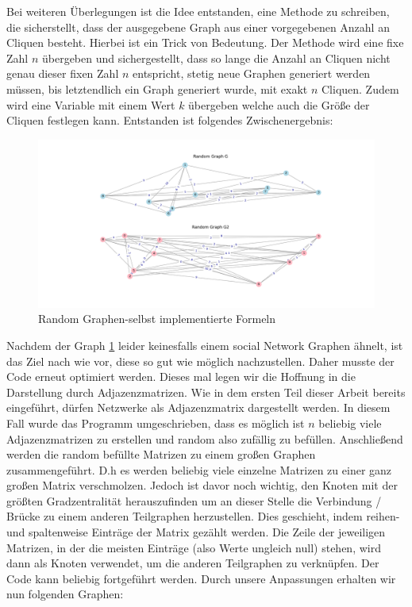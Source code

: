 Bei weiteren Überlegungen ist die Idee entstanden, eine Methode zu schreiben, die sicherstellt, dass der ausgegebene Graph aus einer vorgegebenen Anzahl an Cliquen besteht. Hierbei ist ein Trick von Bedeutung. Der Methode wird eine fixe Zahl $n$ übergeben und sichergestellt, dass so lange die Anzahl an Cliquen nicht genau dieser fixen Zahl $n$ entspricht, stetig neue Graphen generiert werden müssen, bis letztendlich ein Graph generiert wurde, mit exakt $n$ Cliquen. Zudem wird eine Variable mit einem Wert $k$ übergeben welche auch die Größe der Cliquen festlegen kann. Entstanden ist folgendes Zwischenergebnis:
\FloatBarrier
\begin{figure}[h!]
    \centering
    \hspace*{-1.5cm}
    \includegraphics[width=1.0\textwidth]{Graphics/perHand2.png}
    \caption{Random Graphen-selbst implementierte Formeln}
    \label{RandomGraphenFormeln}
\end{figure}

\FloatBarrier

Nachdem der Graph \ref{RandomGraphenFormeln} leider keinesfalls einem social Network Graphen ähnelt, ist das Ziel nach wie vor, diese so gut wie möglich nachzustellen. Daher musste der Code erneut optimiert werden. Dieses mal legen wir die Hoffnung in die Darstellung durch Adjazenzmatrizen. Wie in dem ersten Teil dieser Arbeit bereits eingeführt, dürfen Netzwerke als Adjazenzmatrix dargestellt werden. In diesem Fall wurde das Programm umgeschrieben, dass es möglich ist $n$ beliebig viele Adjazenzmatrizen zu erstellen und random also zufällig zu befüllen. Anschließend werden die random befüllte Matrizen zu einem großen Graphen zusammengeführt. D.h es werden beliebig viele einzelne Matrizen zu einer ganz großen Matrix verschmolzen. Jedoch ist davor noch wichtig, den Knoten mit der größten Gradzentralität herauszufinden um an dieser Stelle die Verbindung / Brücke zu einem anderen Teilgraphen herzustellen. Dies geschieht, indem reihen- und spaltenweise Einträge der Matrix gezählt werden. Die Zeile der jeweiligen Matrizen, in der die meisten Einträge (also Werte ungleich null) stehen, wird dann als Knoten verwendet, um die anderen Teilgraphen zu verknüpfen. Der Code kann beliebig fortgeführt werden. Durch unsere Anpassungen erhalten wir nun folgenden Graphen:

